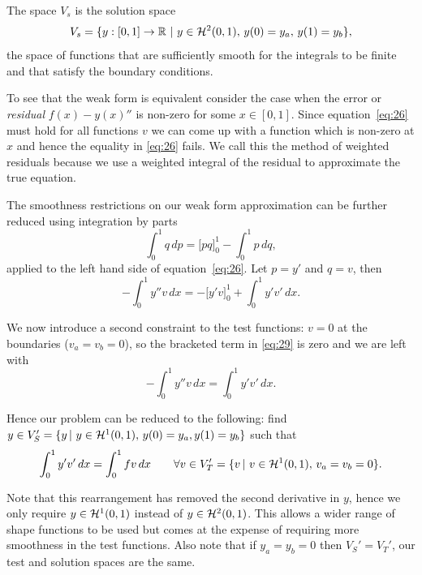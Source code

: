 The space $V_{s}$ is the solution space
\begin{equation*}
  V_{s}=\{y:[0,1]\rightarrow\mathbb{R}\, \,|\, \, y \in \mathcal{H}^2(0,1),\,
  y(0) = y_{a},\, y(1) = y_{b}\},
\end{equation*}
\ie the space of functions that are sufficiently smooth for the integrals to be finite and that satisfy the boundary conditions.

To see that the weak form is equivalent consider the case when the error or \emph{residual} $f(x) -y(x)''$ is non-zero for some $x \in [0,1]$. Since equation~\eqref{eq:26} must hold for all functions $v$ we can come up with a function which is non-zero at $x$ and hence the equality in \eqref{eq:26} fails. We call this the method of weighted residuals because we use a weighted integral of the residual to approximate the true equation.\cite[210, 214]{Zeinkiewicz1967}

The smoothness restrictions on our weak form approximation can be further reduced using integration by parts
\begin{equation*}
  \int_{0}^{1}q\, dp=\Big[pq\Big]_{0}^{1}-\int_{0}^{1}p\, dq,
\end{equation*}
applied to the left hand side of equation~\eqref{eq:26}. Let $p=y'$ and $q=v$, then
\begin{equation}
  -\int_{0}^{1}y''v\, dx=-\Big[y'v\Big]_{0}^{1}+\int_{0}^{1}y'v'\, dx.
  \label{eq:29}
\end{equation}

We now introduce a second constraint to the test functions: $v=0$
at the boundaries (\ie $v_a=v_b=0$), so the bracketed term in \eqref{eq:29} is
zero and we are left with
\begin{equation*}
  -\int_{0}^{1}y''v\, dx=\int_{0}^{1}y'v'\, dx.
\end{equation*}

Hence our problem can be reduced to the following: find $y\in V_{S}'=\{y \,|\, \, y \in \mathcal{H}^1(0,1),\, y(0) = y_a, y(1) = y_b \}$
such that
\begin{equation}
  \int_{0}^{1}y'v'\, dx=\int_{0}^{1}fv\, dx\qquad\forall v\in V'_{T}=\{v \,|\, \, v \in \mathcal{H}^1(0,1),\, v_a=v_b=0\}.\label{eq:symmetric-weak-poisson}
\end{equation}

Note that this rearrangement has removed the second derivative in $y$, hence we only require $y \in \mathcal{H}^1(0,1)$ instead of $y \in \mathcal{H}^2(0,1)$. This allows a wider range of shape
functions to be used but comes at the expense of requiring more smoothness in
the test functions. Also note that if $y_a = y_b = 0$ then $V_{S}'=V_{T}'$, our
test and solution spaces are the same.

